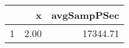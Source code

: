 \begin{table}[h]
\centering
\begin{tabular}{rrr}
  \hline
 & x & avgSampPSec \\ 
  \hline
1 & 2.00 & 17344.71 \\ 
   \hline
\end{tabular}
\end{table}
